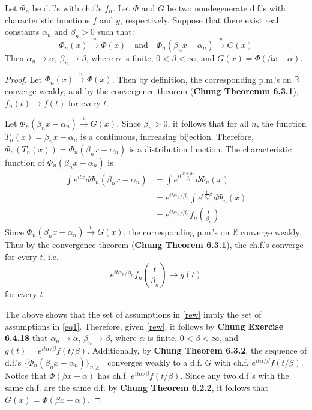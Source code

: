 \documentclass[letterpaper, 12pt]{article}
\newcommand{\R}{\mathbb{R}}
\begin{document}
Let $\Phi_n$ be d.f.'s with ch.f.'s $f_n$.
Let $\Phi$ and $G$ be two nondegenerate d.f.'s with characteristic functions $f$ and $g$, respectively. Suppose that there exist real constants $\alpha_n$ and $\beta_n>0$ such that:
\begin{equation}
\Phi_n(x) \xrightarrow{v} \Phi(x) 
\quad \text{and} \quad
\Phi_n(\beta_nx - \alpha_n) 
\xrightarrow{v}
G(x)
\label{rew}
\end{equation}
Then $\alpha_n \to \alpha$, $\beta_n \to \beta$, where $\alpha$ is finite, $0 < \beta<\infty$, and $G(x) = \Phi(\beta x - \alpha)$.

\begin{proof}
Let $\Phi_n(x) \xrightarrow{v} \Phi(x)$. 
Then by definition, the corresponding p.m.'s on $\R$ converge weakly, and by the convergence theorem (\textbf{Chung Theoremm 6.3.1}), $f_n(t) \to f(t)$ for every $t$.

Let $\Phi_n(\beta_nx - \alpha_n) 
\xrightarrow{v}
G(x)$. Since $\beta_n > 0$, it follows that for all $n$, the function $T_n(x) = \beta_n x - \alpha_n$ is a continuous, increasing bijection. 
Therefore, $\Phi_n(T_n(x)) = \Phi_n(\beta_nx - \alpha_n)$ is a distribution function. 
The characteristic function of $\Phi_n(\beta_nx - \alpha_n)$ is 
\begin{align*}
\int e^{itx} d\Phi_n(\beta_nx - \alpha_n)
&=
\int e^{it\frac{x+\alpha_n}{\beta_n}} d\Phi_n(x)
\\
&=
e^{it\alpha_n/\beta_n}\int e^{i\frac{t}{\beta_n} x} d\Phi_n(x)
\\
&=
e^{it\alpha_n/\beta_n} f_n
\left(
\frac{t}{\beta_n}
\right)
\end{align*}
Since  $\Phi_n(\beta_nx - \alpha_n) 
\xrightarrow{v}
G(x)$, the corresponding p.m.'s on $\R$ converge weakly. Thus by the convergence theorem (\textbf{Chung Theorem 6.3.1}), the ch.f.'s converge for every $t$, i.e.
\[
e^{it\alpha_n/\beta_n} f_n
\left(
\frac{t}{\beta_n}
\right)
\to 
g(t)
\]
for every $t$.

The above shows that the set of assumptions in \eqref{rew} imply the set of assumptions in \eqref{eq1}. 
Therefore, given \eqref{rew}, it follows by \textbf{Chung Exercise 6.4.18} that $\alpha_n \to \alpha$, $\beta_n \to \beta$, where $\alpha$ is finite, $0 < \beta < \infty$, and $g(t) = e^{it\alpha/\beta}f(t/\beta)$. 
Additionally, by \textbf{Chung Theorem 6.3.2}, the sequence of d.f.'s $\{\Phi_n(\beta_nx - \alpha_n) \}_{n \geq 1}$ converges weakly to a d.f. $G$ with ch.f. $e^{it\alpha/\beta}f(t/\beta)$. 
Notice that $\Phi(\beta x -\alpha)$ has ch.f. $e^{it\alpha/\beta}f(t/\beta)$. 
Since any two d.f.'s with the same ch.f. are the same d.f. by \textbf{Chung Theorem 6.2.2}, it follows that $G(x) = \Phi(\beta x -\alpha)$.
\end{proof}
\end{document}
